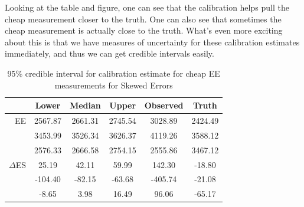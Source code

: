 \documentclass[11pt]{article}\usepackage[]{graphicx}\usepackage[]{color}
\begin{document}
Looking at the table and figure, one can see that the calibration helps pull the cheap measurement closer to the truth. One can also see that sometimes the cheap measurement is actually close to the truth. What's even more exciting about this is that we have measures of uncertainty for these calibration estimates immediately, and thus we can get credible intervals easily.

\begin{table}[ht]
\centering
\begin{tabular}{r|ccc|cc}
  \hline
& Lower & Median & Upper & Observed & Truth \\ 
  \hline
EE & 2567.87 & 2661.31 & 2745.54 & 3028.89 & 2424.49 \\ 
 & 3453.99 & 3526.34 & 3626.37 & 4119.26 & 3588.12 \\ 
 & 2576.33 & 2666.58 & 2754.15 & 2555.86 & 3467.12 \\ 
   \hline  
   $\Delta$ES & 25.19 & 42.11 & 59.99 & 142.30 & -18.80 \\ 
  & -104.40 & -82.15 & -63.68 & -405.74 & -21.08 \\ 
  & -8.65 & 3.98 & 16.49 & 96.06 & -65.17 \\ 
   \hline
\end{tabular}
\caption{95\% credible interval for calibration estimate for cheap EE measurements for Skewed Errors} 
\label{calibratedee}
\end{table}
\end{document}

